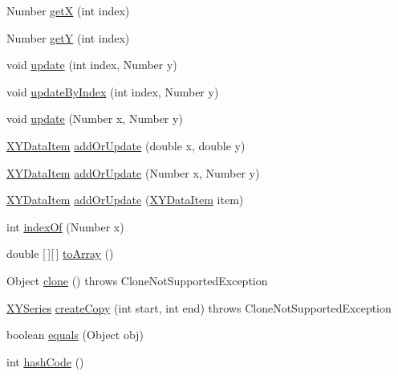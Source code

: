 \begin{DoxyCompactItemize}
\item 
Number \mbox{\hyperlink{classorg_1_1jfree_1_1data_1_1xy_1_1_x_y_series_a8e49ef24964fe679c9717c7524580fee}{getX}} (int index)
\item 
Number \mbox{\hyperlink{classorg_1_1jfree_1_1data_1_1xy_1_1_x_y_series_a60fbd356263fa7cae94de0ec868dc34d}{getY}} (int index)
\item 
void \mbox{\hyperlink{classorg_1_1jfree_1_1data_1_1xy_1_1_x_y_series_a85dbeaa30cf77cea90bd1e101f80cc3b}{update}} (int index, Number y)
\item 
void \mbox{\hyperlink{classorg_1_1jfree_1_1data_1_1xy_1_1_x_y_series_a24d44781254e600031fdd524049c2a05}{update\+By\+Index}} (int index, Number y)
\item 
void \mbox{\hyperlink{classorg_1_1jfree_1_1data_1_1xy_1_1_x_y_series_a9aedfe39735dc54c4b9683cd32cb1353}{update}} (Number x, Number y)
\item 
\mbox{\hyperlink{classorg_1_1jfree_1_1data_1_1xy_1_1_x_y_data_item}{X\+Y\+Data\+Item}} \mbox{\hyperlink{classorg_1_1jfree_1_1data_1_1xy_1_1_x_y_series_a20ce5647cc63fa95fb66295a18a5d09d}{add\+Or\+Update}} (double x, double y)
\item 
\mbox{\hyperlink{classorg_1_1jfree_1_1data_1_1xy_1_1_x_y_data_item}{X\+Y\+Data\+Item}} \mbox{\hyperlink{classorg_1_1jfree_1_1data_1_1xy_1_1_x_y_series_af14c3bb52923907689696b162ba8a078}{add\+Or\+Update}} (Number x, Number y)
\item 
\mbox{\hyperlink{classorg_1_1jfree_1_1data_1_1xy_1_1_x_y_data_item}{X\+Y\+Data\+Item}} \mbox{\hyperlink{classorg_1_1jfree_1_1data_1_1xy_1_1_x_y_series_af7760a410b50c04ce4a76249d23c57d1}{add\+Or\+Update}} (\mbox{\hyperlink{classorg_1_1jfree_1_1data_1_1xy_1_1_x_y_data_item}{X\+Y\+Data\+Item}} item)
\item 
int \mbox{\hyperlink{classorg_1_1jfree_1_1data_1_1xy_1_1_x_y_series_a47c4d69bb286bfd3cfb08a80e426d450}{index\+Of}} (Number x)
\item 
double \mbox{[}$\,$\mbox{]}\mbox{[}$\,$\mbox{]} \mbox{\hyperlink{classorg_1_1jfree_1_1data_1_1xy_1_1_x_y_series_a1b5d7a37bf6d8ff6c6ec6689653b3589}{to\+Array}} ()
\item 
Object \mbox{\hyperlink{classorg_1_1jfree_1_1data_1_1xy_1_1_x_y_series_a1459f456863264713ab4f722d0f5fc62}{clone}} ()  throws Clone\+Not\+Supported\+Exception 
\item 
\mbox{\hyperlink{classorg_1_1jfree_1_1data_1_1xy_1_1_x_y_series}{X\+Y\+Series}} \mbox{\hyperlink{classorg_1_1jfree_1_1data_1_1xy_1_1_x_y_series_ab8fe2ad31f64c4db93a7fcd55f7d3bca}{create\+Copy}} (int start, int end)  throws Clone\+Not\+Supported\+Exception 
\item 
boolean \mbox{\hyperlink{classorg_1_1jfree_1_1data_1_1xy_1_1_x_y_series_a295efdc62e75f67f44b12cb11ea1cb0d}{equals}} (Object obj)
\item 
int \mbox{\hyperlink{classorg_1_1jfree_1_1data_1_1xy_1_1_x_y_series_aaf54ed4875262167d9e87e8b6123f552}{hash\+Code}} ()
\end{DoxyCompactItemize}
